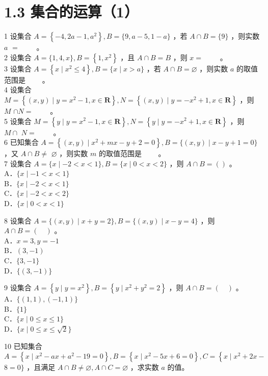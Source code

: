 \documentclass[10pt]{article}
\begin{document}
\section*{1.3 集合的运算（1）}
1 设集合 \(A=\left\{-4,2 a-1, a^{2}\right\}, B=\{9, a-5,1-a\}\) ，若 \(A \cap B=\{9\}\) ，则实数 \(a\) \(=\) \(\qquad\)。\\
2 设集合 \(A=\{1,4, x\}, B=\left\{1, x^{2}\right\}\) ，且 \(A \cap B=B\) ，则 \(x=\) \(\qquad\)。\\
3 设集合 \(A=\left\{x \mid x^{2} \leqslant 4\right\}, B=\{x \mid x>a\}\) ，若 \(A \cap B=\varnothing\) ，则实数 \(a\) 的取值范围是 \(\qquad\)。\\
4 设集合 \(M=\left\{(x, y) \mid y=x^{2}-1, x \in \mathbf{R}\right\}, N=\left\{(x, y) \mid y=-x^{2}+1, x \in \mathbf{R}\right\}\) ，则 \(M\) \(\cap N=\) \(\qquad\)。\\
5 设集合 \(M=\left\{y \mid y=x^{2}-1, x \in \mathbf{R}\right\}, N=\left\{y \mid y=-x^{2}+1, x \in \mathbf{R}\right\}\) ，则 \(M \cap\) \(N=\) \(\qquad\)。\\
6 已知集合 \(A=\left\{(x, y) \mid x^{2}+m x-y+2=0\right\}, B=\{(x, y) \mid x-y+1=0\}\) ，又 \(A \cap B \neq\) \(\varnothing\) ，则实数 \(m\) 的取值范围是 \(\qquad\)。\\
7 设集合 \(A=\{x \mid-2<x<1\}, B=\{x \mid 0<x<2\}\) ，则 \(A \cap B=()\) 。\\
A．\(\{x \mid-1<x<1\}\)\\
B．\(\{x \mid-2<x<1\}\)\\
C．\(\{x \mid-2<x<2\}\)\\
D．\(\{x \mid 0<x<1\}\)

8 设集合 \(A=\{(x, y) \mid x+y=2\}, B=\{(x, y) \mid x-y=4\}\) ，则 \(A \cap B=(\quad)\) 。\\
A．\(x=3, y=-1\)\\
B．\((3,-1)\)\\
C．\(\{3,-1\}\)\\
D．\(\{(3,-1)\}\)

9 设集合 \(A=\left\{y \mid y=x^{2}\right\}, B=\left\{y \mid x^{2}+y^{2}=2\right\}\) ，则 \(A \cap B=(\quad)\) 。\\
A．\(\{(1,1),(-1,1)\}\)\\
B．\(\{1\}\)\\
C．\(\{x \mid 0 \leqslant x \leqslant 1\}\)\\
D．\(\{x \mid 0 \leqslant x \leqslant \sqrt{2}\}\)

10 已知集合 \(A=\left\{x \mid x^{2}-a x+a^{2}-19=0\right\}, B=\left\{x \mid x^{2}-5 x+6=0\right\}, C=\left\{x \mid x^{2}+2 x-\right.\) \(8=0\}\) ，且满足 \(A \cap B \neq \varnothing, A \cap C=\varnothing\) ，求实数 \(a\) 的值。
\end{document}
